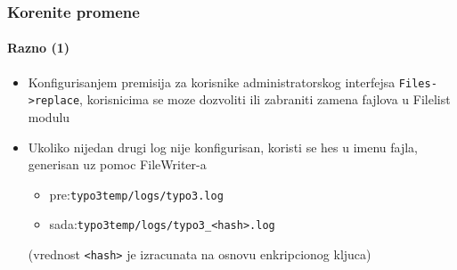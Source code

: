 
\begin{frame}[fragile]
	\frametitle{Korenite promene}
	\framesubtitle{Razno (1)}

	\lstset{basicstyle=\tiny\ttfamily}

	\begin{itemize}

		\item Konfigurisanjem premisija za korisnike administratorskog interfejsa \texttt{Files->replace}, korisnicima se moze dozvoliti ili zabraniti zamena fajlova u Filelist modulu


		\item Ukoliko nijedan drugi log nije konfigurisan, koristi se hes u imenu fajla, generisan uz pomoc FileWriter-a

			\begin{itemize}
				\item pre:\tabto{1.2cm}\texttt{typo3temp/logs/typo3.log}
				\item sada:\tabto{1.2cm}\texttt{typo3temp/logs/typo3\_<hash>.log}
			\end{itemize}

			\small(vrednost \texttt{<hash>} je izracunata na osnovu enkripcionog kljuca)\normalsize


	\end{itemize}

\end{frame}


